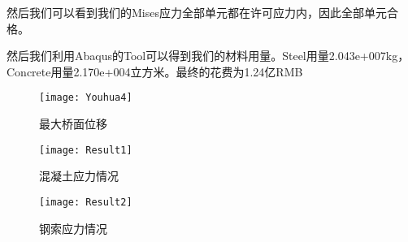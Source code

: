 \documentclass[UTF8]{ctexart}
\begin{document}
然后我们可以看到我们的Mises应力全部单元都在许可应力内，因此全部单元合格。

然后我们利用Abaqus的Tool可以得到我们的材料用量。Steel用量2.043e+007kg，Concrete用量2.170e+004立方米。最终的花费为1.24亿RMB

\begin{figure}[h]%
	\centering  %
	\texttt{[image: Youhua4]}  %
	\caption{最大桥面位移}  %
\end{figure}
\begin{figure}[h]
	\begin{minipage}[t]{0.5\linewidth}
		\centering
		\texttt{[image: Result1]}
		\caption{混凝土应力情况}
	\end{minipage}%
	\hfill
	\begin{minipage}[t]{0.5\linewidth}
		\centering
		\texttt{[image: Result2]}
		\caption{钢索应力情况}
	\end{minipage}
\end{figure}

%
\end{document}
